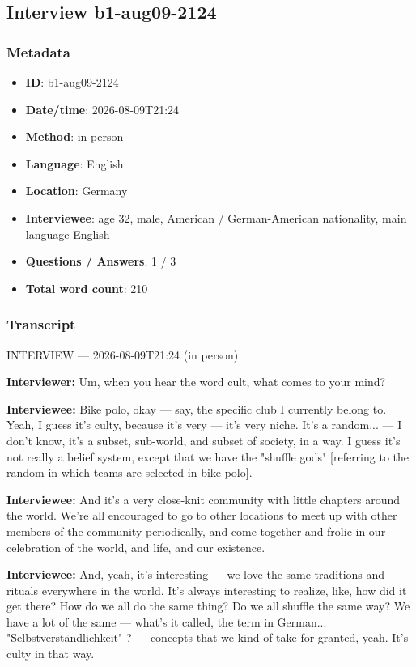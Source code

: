 \subsection{Interview b1-aug09-2124}\label{int:b1-aug09-2124}
\subsubsection*{Metadata}
\begin{itemize}
  \item \textbf{ID}: b1-aug09-2124
  \item \textbf{Date/time}: 2026-08-09T21:24
  \item \textbf{Method}: in person
  \item \textbf{Language}: English
  \item \textbf{Location}: Germany
  \item \textbf{Interviewee}: age 32, male, American / German-American nationality, main language English
  \item \textbf{Questions / Answers}: 1 / 3
  \item \textbf{Total word count}: 210
\end{itemize}
\subsubsection*{Transcript}
INTERVIEW — 2026-08-09T21:24 (in person)

\textbf{Interviewer:} Um, when you hear the word cult, what comes to your mind?

\textbf{Interviewee:} Bike polo, okay — say, the specific club I currently belong to. Yeah, I guess it's culty, because it's very — it's very niche. It's a random... — I don't know, it's a subset, sub-world, and subset of society, in a way. I guess it's not really a belief system, except that we have the "shuffle gods" [referring to the random in which teams are selected in bike polo].

\textbf{Interviewee:} And it's a very close-knit community with little chapters around the world. We're all encouraged to go to other locations to meet up with other members of the community periodically, and come together and frolic in our celebration of the world, and life, and our existence.

\textbf{Interviewee:} And, yeah, it's interesting — we love the same traditions and rituals everywhere in the world. It's always interesting to realize, like, how did it get there? How do we all do the same thing? Do we all shuffle the same way? We have a lot of the same — what's it called, the term in German... "Selbstverständlichkeit" ? — concepts that we kind of take for granted, yeah. It's culty in that way.

